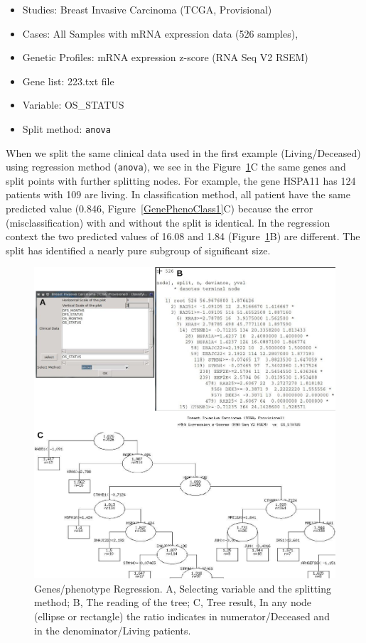 \documentclass[a4paper]{article}
\begin{document}
\begin{itemize}
    \item Studies:  Breast Invasive Carcinoma (TCGA, Provisional)
    \item Cases: All Samples with mRNA expression data (526 samples),
    \item Genetic Profiles: mRNA expression z-score (RNA Seq V2 RSEM)
    \item Gene list: 223.txt file
    \item  Variable: OS\_STATUS
    \item Split method: \texttt{anova}
 \end{itemize}

When we split the same clinical data used in the first example (Living/Deceased) using regression method (\texttt{anova}), we see in the Figure~\ref{GenePhenoClass2}C the same genes and split points with further splitting nodes. For example, the gene HSPA11 has 124 patients with 109 are living. In classification method, all patient have the same predicted value (0.846, Figure~\ref{GenePhenoClass1}C) because the error (misclassification) with and without the split is identical. In the regression context the two predicted values of 16.08 and  1.84 (Figure~\ref{GenePhenoClass2}B) are different. The split has identified a nearly pure subgroup of significant size.


\begin{figure}[!ht]
  \centering
 \includegraphics[scale=1]{image/GenePhenoClass2.png}
 \caption{Genes/phenotype Regression. A, Selecting variable and the splitting method; B, The reading of the tree; C, Tree result, In any node (ellipse or rectangle) the ratio indicates in numerator/Deceased and in the denominator/Living patients. }
 \label{GenePhenoClass2}
 \end{figure}
\end{document}
